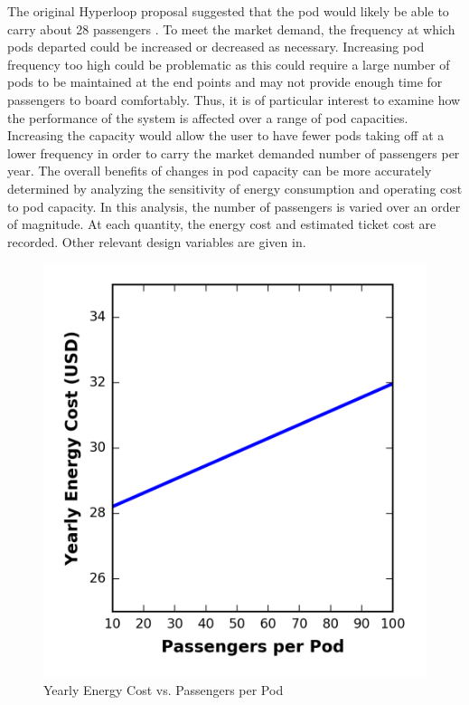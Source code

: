 The original Hyperloop proposal suggested
that the pod would likely be able to carry about 28 passengers \cite{Musk}.
To meet the market demand, the frequency at which pods departed could be
increased or decreased as necessary. Increasing pod frequency too high could be
problematic as this could require a large number of pods to be maintained at
the end points and may not provide enough time for passengers to board comfortably.
Thus, it is of particular interest to examine how the performance of the system
is affected over a range of pod capacities. Increasing the capacity would allow
the user to have fewer pods taking off at a lower frequency in order to carry
the market demanded number of passengers per year. The overall benefits of
changes in pod capacity can be more accurately determined by analyzing the
sensitivity of energy consumption and operating cost to pod capacity.
In this analysis, the number of passengers is varied over an order of magnitude.
At each quantity, the energy cost and estimated ticket cost are recorded.
Other relevant design variables are given in.
\begin{figure}
	\centering
	\includegraphics{../../images/graphs/capacity_trades/passengers_vs_energy.png}
	\caption{Yearly Energy Cost vs. Passengers per Pod}
	\label{fig:energy_cost_vs_passengers}
\end{figure}
